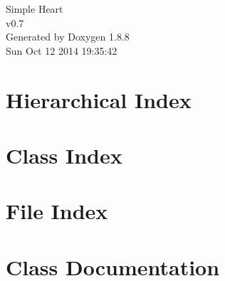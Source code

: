 \documentclass[twoside]{book}
\newcommand{\+}{\discretionary{\mbox{\scriptsize$\hookleftarrow$}}{}{}}
\newcommand{\clearemptydoublepage}{%
  \newpage{\pagestyle{empty}\cleardoublepage}%
}
\begin{document}
\hypersetup{pageanchor=false,
             bookmarks=true,
             bookmarksnumbered=true,
             pdfencoding=unicode
            }
\begin{titlepage}
\vspace*{7cm}
\begin{center}%
{\Large Simple Heart \\[1ex]\large v0.\+7 }\\
\vspace*{1cm}
{\large Generated by Doxygen 1.8.8}\\
\vspace*{0.5cm}
{\small Sun Oct 12 2014 19:35:42}\\
\end{center}
\end{titlepage}
\clearemptydoublepage
\tableofcontents
\clearemptydoublepage
{}
\hypersetup{pageanchor=true}

\chapter{Hierarchical Index}

\chapter{Class Index}

\chapter{File Index}

\chapter{Class Documentation}

































\end{document}
